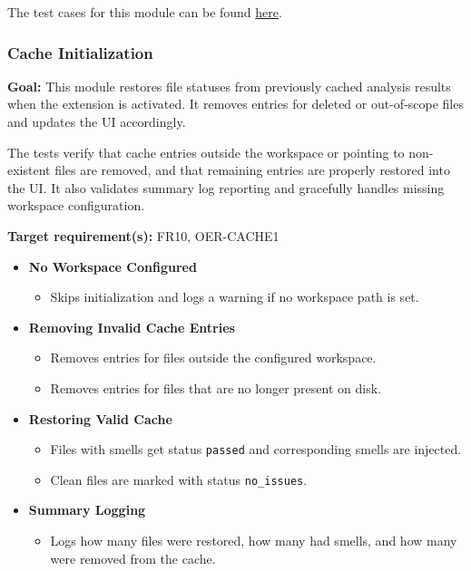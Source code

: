 \documentclass[12pt, titlepage]{article}
\begin{document}
\noindent The test cases for this module can be found
\href{https://github.com/ssm-lab/capstone--sco-vs-code-plugin/blob/plugin-multi-file/test/ui/lineSelectionManager.test.ts}{here}.

\subsubsection{Cache Initialization}

\textbf{Goal:} This module restores file statuses from previously cached analysis results when the extension is activated. It removes entries for deleted or out-of-scope files and updates the UI accordingly.

\medskip

\noindent The tests verify that cache entries outside the workspace or pointing to non-existent files are removed, and that remaining entries are properly restored into the UI. It also validates summary log reporting and gracefully handles missing workspace configuration.

\medskip

\noindent\textbf{Target requirement(s):} FR10, OER-CACHE1~\cite{SRS}

\begin{itemize}
  \item \textbf{No Workspace Configured}
    \begin{itemize}
      \item Skips initialization and logs a warning if no workspace path is set.
    \end{itemize}

  \item \textbf{Removing Invalid Cache Entries}
    \begin{itemize}
      \item Removes entries for files outside the configured workspace.
      \item Removes entries for files that are no longer present on disk.
    \end{itemize}

  \item \textbf{Restoring Valid Cache}
    \begin{itemize}
      \item Files with smells get status \texttt{passed} and corresponding smells are injected.
      \item Clean files are marked with status \texttt{no\_issues}.
    \end{itemize}

  \item \textbf{Summary Logging}
    \begin{itemize}
      \item Logs how many files were restored, how many had smells, and how many were removed from the cache.
    \end{itemize}
\end{itemize}
\end{document}
